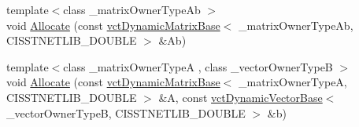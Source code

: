 {\bf }\par
\begin{DoxyCompactItemize}
\item 
{\footnotesize template$<$class \+\_\+matrix\+Owner\+Type\+Ab $>$ }\\void \hyperlink{classnmr_n_n_l_s_dynamic_data_aea2d755741d076fbcf78b3a67670af77}{Allocate} (const \hyperlink{classvct_dynamic_matrix_base}{vct\+Dynamic\+Matrix\+Base}$<$ \+\_\+matrix\+Owner\+Type\+Ab, C\+I\+S\+S\+T\+N\+E\+T\+L\+I\+B\+\_\+\+D\+O\+U\+B\+L\+E $>$ \&Ab)
\item 
{\footnotesize template$<$class \+\_\+matrix\+Owner\+Type\+A , class \+\_\+vector\+Owner\+Type\+B $>$ }\\void \hyperlink{classnmr_n_n_l_s_dynamic_data_afc1c5ac57bc98058442ed98561b17f6c}{Allocate} (const \hyperlink{classvct_dynamic_matrix_base}{vct\+Dynamic\+Matrix\+Base}$<$ \+\_\+matrix\+Owner\+Type\+A, C\+I\+S\+S\+T\+N\+E\+T\+L\+I\+B\+\_\+\+D\+O\+U\+B\+L\+E $>$ \&A, const \hyperlink{classvct_dynamic_vector_base}{vct\+Dynamic\+Vector\+Base}$<$ \+\_\+vector\+Owner\+Type\+B, C\+I\+S\+S\+T\+N\+E\+T\+L\+I\+B\+\_\+\+D\+O\+U\+B\+L\+E $>$ \&b)
\end{DoxyCompactItemize}

